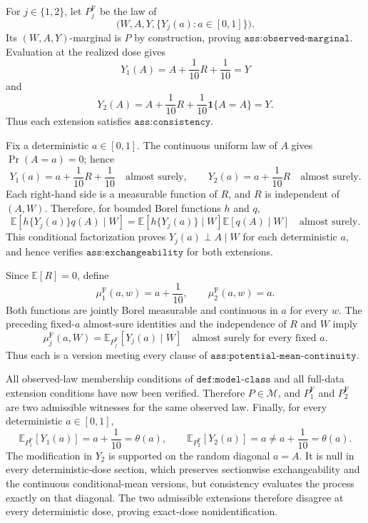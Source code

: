 For \(j\in\{1,2\}\), let \(P_j^{\mathrm F}\) be the law of
\[
 \bigl(W,A,Y,\{Y_j(a):a\in[0,1]\}\bigr).
\]
Its \((W,A,Y)\)-marginal is \(P\) by construction, proving \(\texttt{ass:observed-marginal}\).  Evaluation at the realized dose gives
\[
 Y_1(A)=A+\frac1{10}R+\frac1{10}=Y
\]
and
\[
 Y_2(A)=A+\frac1{10}R+\frac1{10}\mathbf 1\{A=A\}=Y.
\]
Thus each extension satisfies \(\texttt{ass:consistency}\).

Fix a deterministic \(a\in[0,1]\).  The continuous uniform law of \(A\) gives \(\Pr(A=a)=0\); hence
\[
 Y_1(a)=a+\frac1{10}R+\frac1{10}\quad\text{almost surely},
 \qquad
 Y_2(a)=a+\frac1{10}R\quad\text{almost surely}.
\]
Each right-hand side is a measurable function of \(R\), and \(R\) is independent of \((A,W)\).  Therefore, for bounded Borel functions \(h\) and \(q\),
\[
 \mathbb E\!\left[h\{Y_j(a)\}q(A)\mid W\right]
 =\mathbb E\!\left[h\{Y_j(a)\}\mid W\right]
  \mathbb E\!\left[q(A)\mid W\right]
 \quad\text{almost surely}.
\]
This conditional factorization proves \(Y_j(a)\perp A\mid W\) for each deterministic \(a\), and hence verifies \(\texttt{ass:exchangeability}\) for both extensions.

Since \(\mathbb E[R]=0\), define
\[
 \mu^{\mathrm F}_1(a,w)=a+\frac1{10},
 \qquad
 \mu^{\mathrm F}_2(a,w)=a.
\]
Both functions are jointly Borel measurable and continuous in \(a\) for every \(w\).  The preceding fixed-\(a\) almost-sure identities and the independence of \(R\) and \(W\) imply
\[
 \mu^{\mathrm F}_j(a,W)
 =\mathbb E_{P_j^{\mathrm F}}[Y_j(a)\mid W]
 \quad\text{almost surely for every fixed }a.
\]
Thus each is a version meeting every clause of \(\texttt{ass:potential-mean-continuity}\).

All observed-law membership conditions of \(\texttt{def:model-class}\) and all full-data extension conditions have now been verified.  Therefore \(P\in\mathcal M\), and \(P_1^{\mathrm F}\) and \(P_2^{\mathrm F}\) are two admissible witnesses for the same observed law.  Finally, for every deterministic \(a\in[0,1]\),
\[
 \mathbb E_{P_1^{\mathrm F}}[Y_1(a)]
 =a+\frac1{10}=\theta(a),
 \qquad
 \mathbb E_{P_2^{\mathrm F}}[Y_2(a)]
 =a\ne a+\frac1{10}=\theta(a).
\]
The modification in \(Y_2\) is supported on the random diagonal \(a=A\).  It is null in every deterministic-dose section, which preserves sectionwise exchangeability and the continuous conditional-mean versions, but consistency evaluates the process exactly on that diagonal.  The two admissible extensions therefore disagree at every deterministic dose, proving exact-dose nonidentification.
